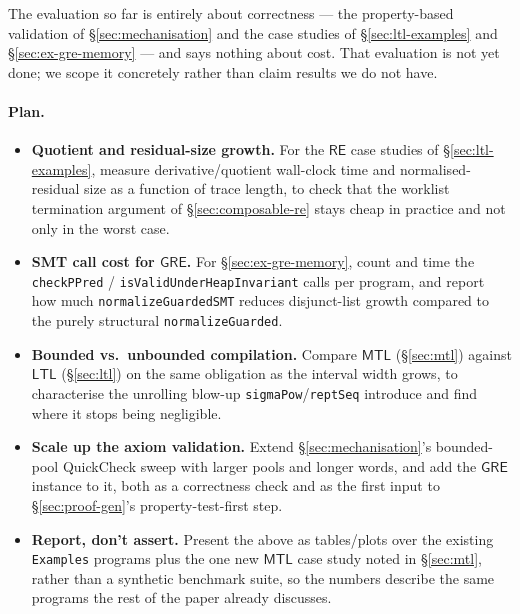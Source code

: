 \documentclass[acmsmall,screen]{acmart}
\newcommand{\RE}{\mathsf{RE}}
\newcommand{\GRE}{\mathsf{GRE}}
\newcommand{\LTL}{\mathsf{LTL}}
\newcommand{\MTL}{\mathsf{MTL}}
\begin{document}
The evaluation so far is entirely about correctness --- the property-based
validation of \S\ref{sec:mechanisation} and the case studies of
\S\ref{sec:ltl-examples} and \S\ref{sec:ex-gre-memory} --- and says nothing
about cost.
That evaluation is not yet done; we scope it concretely rather than claim
results we do not have.

\paragraph{Plan.}
\begin{itemize}[wide, labelindent=10pt]
  \item \textbf{Quotient and residual-size growth.} For the $\RE$ case
        studies of \S\ref{sec:ltl-examples}, measure derivative/quotient
        wall-clock time and normalised-residual size as a function of trace
        length, to check that the worklist termination argument of
        \S\ref{sec:composable-re} stays cheap in practice and not only in
        the worst case.
  \item \textbf{SMT call cost for $\GRE$.} For \S\ref{sec:ex-gre-memory},
        count and time the \lstinline{checkPPred} /
        \lstinline{isValidUnderHeapInvariant} calls per program, and report
        how much \lstinline{normalizeGuardedSMT} reduces disjunct-list
        growth compared to the purely structural
        \lstinline{normalizeGuarded}.
  \item \textbf{Bounded vs.\ unbounded compilation.} Compare $\MTL$
        (\S\ref{sec:mtl}) against $\LTL$ (\S\ref{sec:ltl}) on the same
        obligation as the interval width grows, to characterise the
        unrolling blow-up \lstinline{sigmaPow}/\lstinline{reptSeq}
        introduce and find where it stops being negligible.
  \item \textbf{Scale up the axiom validation.} Extend
        \S\ref{sec:mechanisation}'s bounded-pool QuickCheck sweep with
        larger pools and longer words, and add the $\GRE$ instance to it,
        both as a correctness check and as the first input to
        \S\ref{sec:proof-gen}'s property-test-first step.
  \item \textbf{Report, don't assert.} Present the above as tables/plots
        over the existing \texttt{Examples} programs plus the one new $\MTL$
        case study noted in \S\ref{sec:mtl}, rather than a synthetic
        benchmark suite, so the numbers describe the same programs the rest
        of the paper already discusses.
\end{itemize}
\end{document}
